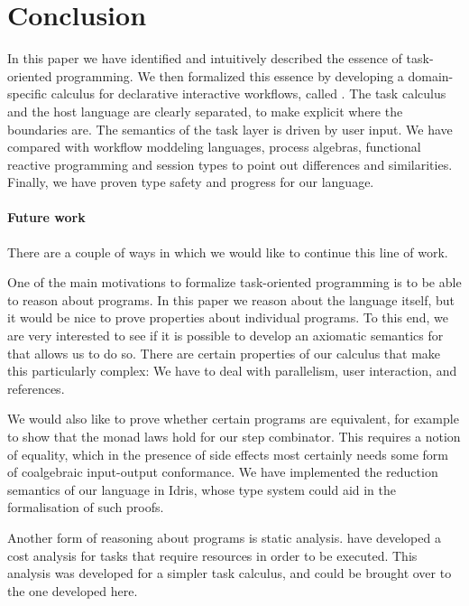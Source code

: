 
\section{Conclusion}

\label{sec:conclusions}

In this paper we have identified and intuitively described the essence of task-oriented programming.
We then formalized this essence by developing a domain-specific calculus for declarative interactive workflows, called \TOPHAT.
The task calculus and the host language are clearly separated, to make explicit where the boundaries are.
The semantics of the task layer is driven by user input.
We have compared \TOPHAT with workflow moddeling languages, process algebras, functional reactive programming and session types to point out differences and similarities.
Finally, we have proven type safety and progress for our language.

\paragraph{Future work}

There are a couple of ways in which we would like to continue this line of work.

One of the main motivations to formalize task-oriented programming is to be able to reason about programs.
In this paper we reason about the language itself, but it would be nice to prove properties about individual programs.
To this end, we are very interested to see if it is possible to develop an axiomatic semantics for \TOPHAT that allows us to do so.
There are certain properties of our calculus that make this particularly complex:
We have to deal with parallelism, user interaction, and references.

We would also like to prove whether certain programs are equivalent, for example to show that the monad laws hold for our step combinator.
This requires a notion of equality, which in the presence of side effects most certainly needs some form of coalgebraic input-output conformance.
We have implemented the reduction semantics of our language in Idris, whose type system could aid in the formalisation of such proofs.

Another form of reasoning about programs is static analysis.
\citet{conf/ifl/KlinikJP17} have developed a cost analysis for tasks that require resources in order to be executed.
This analysis was developed for a simpler task calculus, and could be brought over to the one developed here.

